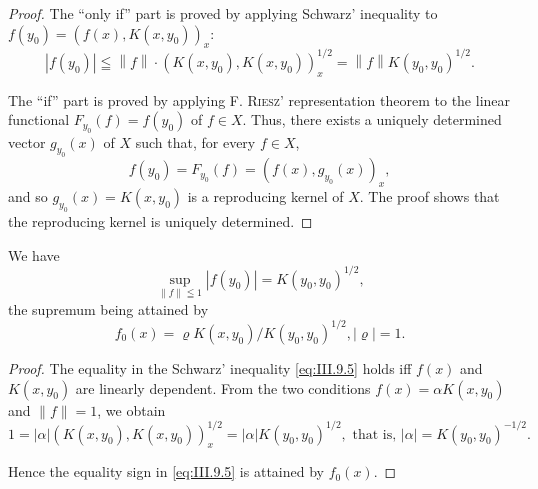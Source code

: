 \begin{proof}
 The ``only if'' part is proved by applying Schwarz' inequality to $f(y_{0}) = (f(x), K(x, y_{0}))_{x}$: 
\begin{equation}\label{eq:III.9.5}
\left| f \left(y _{0}\right) \right| \leqq \left\| f \right\| \cdot \left(K \left(x, y _{0}\right), K \left(x, y _{0}\right)\right) _{x} ^{1/2} = \left\| f \right\| K \left(y _{0}, y _{0}\right) ^{1/2}. \end{equation}

The ``if'' part is proved by applying F. \textsc{Riesz}' representation theorem to the linear functional $F_{y_{0}}(f) = f(y_{0})$ of $f \in X$. Thus, there exists a uniquely determined vector $g_{y_{0}}(x)$ of $X$ such that, for every $f \in X$, 
\[
f (y _{0}) = F _ {y _{0}} (f) = (f (x), g _ {y _{0}} (x)) _{x},
\]
and so $g_{y_0}(x) = K(x, y_0)$ is a reproducing kernel of $X$. The proof shows that the reproducing kernel is uniquely determined. 
\end{proof}

\begin{corollaryu} We have 
\begin{equation}\label{eq:III.9.6}
\sup\limits _{\| f \| \leqq 1} | f (y _{0}) | = K (y _{0}, y _{0}) ^{1/2},
\end{equation}
the supremum being attained by 
\begin{equation}\label{eq:III.9.7}
f _{0} (x) = \varrho K (x, y _{0}) / K (y _{0}, y _{0}) ^{1/2}, | \varrho | = 1.
\end{equation}
\end{corollaryu}

\begin{proof}
 The equality in the Schwarz' inequality \eqref{eq:III.9.5} holds iff $f(x)$ and $K(x, y_0)$ are linearly dependent. From the two conditions $f(x) = \alpha K(x, y_0)$ and $\|f\| = 1$, we obtain 
\[
1 = | \alpha | (K (x, y _{0}), K (x, y _{0})) _{x} ^{1/2} = | \alpha | K (y _{0}, y _{0}) ^{1/2}, \text{ that is, } | \alpha | = K (y _{0}, y _{0}) ^{-1/2}. \]

Hence the equality sign in \eqref{eq:III.9.5} is attained by $f_0(x)$. 
\end{proof}

